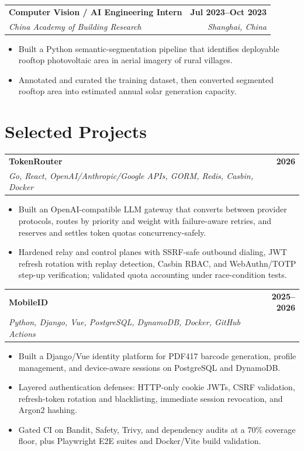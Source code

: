 \documentclass[10pt,letterpaper]{article}
\makeatletter
\newcommand{\resumeEntry}[4]{%
  \begin{tabular*}{\textwidth}{@{\extracolsep{\fill}}lr}
    \textbf{#1} & \textbf{#2} \\
    \textit{#3} & \textit{#4}
  \end{tabular*}\vspace{-2pt}
}
\makeatother
\begin{document}
\resumeEntry
  {Computer Vision / AI Engineering Intern}
  {Jul 2023--Oct 2023}
  {China Academy of Building Research}
  {Shanghai, China}
\begin{itemize}
  \item Built a Python semantic-segmentation pipeline that identifies deployable rooftop photovoltaic area in aerial imagery of rural villages.
  \item Annotated and curated the training dataset, then converted segmented rooftop area into estimated annual solar generation capacity.
\end{itemize}

\section{Selected Projects}

\resumeEntry
  {TokenRouter}
  {2026}
  {Go, React, OpenAI/Anthropic/Google APIs, GORM, Redis, Casbin, Docker}
  {}
\begin{itemize}
  \item Built an OpenAI-compatible LLM gateway that converts between provider protocols, routes by priority and weight with failure-aware retries, and reserves and settles token quotas concurrency-safely.
  \item Hardened relay and control planes with SSRF-safe outbound dialing, JWT refresh rotation with replay detection, Casbin RBAC, and WebAuthn/TOTP step-up verification; validated quota accounting under race-condition tests.
\end{itemize}

\resumeEntry
  {MobileID}
  {2025--2026}
  {Python, Django, Vue, PostgreSQL, DynamoDB, Docker, GitHub Actions}
  {}
\begin{itemize}
  \item Built a Django/Vue identity platform for PDF417 barcode generation, profile management, and device-aware sessions on PostgreSQL and DynamoDB.
  \item Layered authentication defenses: HTTP-only cookie JWTs, CSRF validation, refresh-token rotation and blacklisting, immediate session revocation, and Argon2 hashing.
  \item Gated CI on Bandit, Safety, Trivy, and dependency audits at a 70\% coverage floor, plus Playwright E2E suites and Docker/Vite build validation.
\end{itemize}
\end{document}
